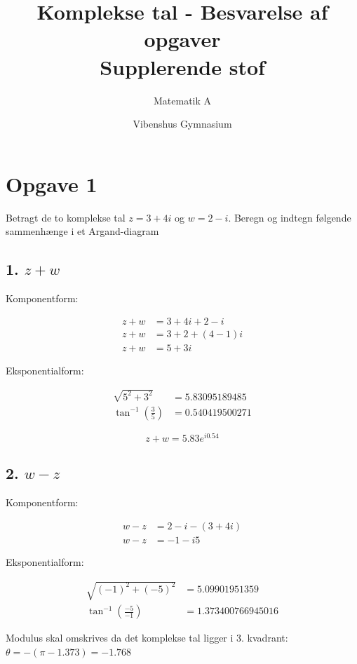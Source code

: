\documentclass[a4paper, 12pt]{article}
\author{Matematik A}
\date{Vibenshus Gymnasium}
\title{Komplekse tal - Besvarelse af opgaver\\\medskip
\large Supplerende stof}
\begin{document}
\maketitle


\section*{Opgave 1}
\label{sec:org41e9968}

Betragt de to komplekse tal \(z=3+4i\) og \(w=2-i\). Beregn og indtegn følgende sammenhænge i et Argand-diagram


\subsection*{1. \(z+w\)}
\label{sec:org3d5e69f}

Komponentform:

\begin{align*}
     z+ w &= 3+4i + 2 -i \\
     z+ w &= 3+2+ (4-1)i \\
     z+ w &= 5+ 3i 
\end{align*}

Eksponentialform:

\begin{align*}
\sqrt{5^2 + 3^2} &= 5.83095189485 \\
\tan^{-1} \left( \frac{3}{5} \right) &= 0.540419500271
\end{align*}

$$z+w= 5.83 e^{i 0.54}$$

\subsection*{2. \(w-z\)}
\label{sec:org3a96da8}

Komponentform:

\begin{align*}
    w-z &= 2 -i -(3 + 4i) \\
    w-z &= -1 -i5 
\end{align*}

Eksponentialform:

\begin{align*}
\sqrt{(-1)^2+(-5)^2} &= 5.09901951359 \\
\tan^{-1} \left( \frac{-5}{-1} \right) &= 1.373400766945016
\end{align*}

Modulus skal omskrives da det komplekse tal ligger i 3. kvadrant: \(\theta = -(\pi - 1.373)=-1.768\)
\end{document}
